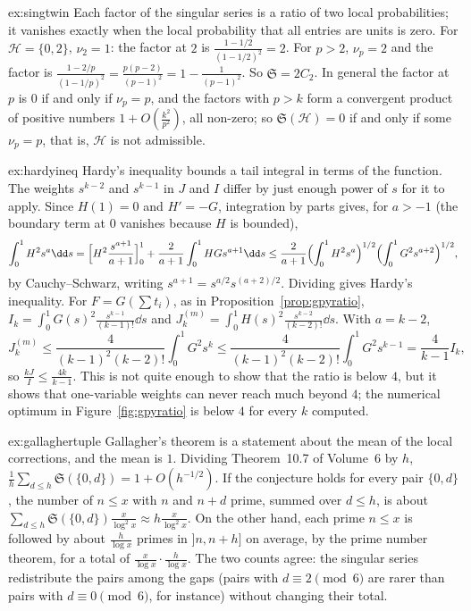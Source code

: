 \begin{solution}{ex:singtwin}
\idea Each factor of the singular series is a ratio of two local probabilities; it vanishes exactly when the local probability that all entries are units is zero.
\writeup For $\mathcal H=\{0,2\}$, $\nu_2=1$: the factor at $2$ is $\frac{1-1/2}{(1-1/2)^2}=2$. For $p>2$, $\nu_p=2$ and the factor is $\frac{1-2/p}{(1-1/p)^2}=\frac{p(p-2)}{(p-1)^2}=1-\frac1{(p-1)^2}$. So $\mathfrak S=2C_2$. In general the factor at $p$ is $0$ if and only if $\nu_p=p$, and the factors with $p>k$ form a convergent product of positive numbers $1+O(\frac{k^2}{p^2})$, all non-zero; so $\mathfrak S(\mathcal H)=0$ if and only if some $\nu_p=p$, that is, $\mathcal H$ is not admissible.
\end{solution}

\begin{solution}{ex:hardyineq}
\idea Hardy's inequality bounds a tail integral in terms of the function. The weights $s^{k-2}$ and $s^{k-1}$ in $J$ and $I$ differ by just enough power of $s$ for it to apply.
\writeup Since $H(1)=0$ and $H'=-G$, integration by parts gives, for $a>-1$ (the boundary term at $0$ vanishes because $H$ is bounded),
\[
\int_0^1H^2s^a\dd s=\Bigl[H^2\frac{s^{a+1}}{a+1}\Bigr]_0^1+\frac2{a+1}\int_0^1HGs^{a+1}\dd s\le\frac2{a+1}\Bigl(\int_0^1H^2s^a\Bigr)^{1/2}\Bigl(\int_0^1G^2s^{a+2}\Bigr)^{1/2},
\]
by Cauchy--Schwarz, writing $s^{a+1}=s^{a/2}s^{(a+2)/2}$. Dividing gives Hardy's inequality. For $F=G(\sum t_i)$, as in Proposition~\ref{prop:gpyratio}, $I_k=\int_0^1G(s)^2\frac{s^{k-1}}{(k-1)!}\dd s$ and $J_k^{(m)}=\int_0^1H(s)^2\frac{s^{k-2}}{(k-2)!}\dd s$. With $a=k-2$,
\[
J_k^{(m)}\le\frac4{(k-1)^2(k-2)!}\int_0^1G^2s^k\le\frac4{(k-1)^2(k-2)!}\int_0^1G^2s^{k-1}=\frac{4}{k-1}I_k,
\]
so $\frac{kJ}I\le\frac{4k}{k-1}$. This is not quite enough to show that the ratio is below $4$, but it shows that one-variable weights can never reach much beyond $4$; the numerical optimum in Figure~\ref{fig:gpyratio} is below $4$ for every $k$ computed.
\end{solution}

\begin{solution}{ex:gallaghertuple}
\idea Gallagher's theorem is a statement about the mean of the local corrections, and the mean is $1$.
\writeup Dividing Theorem~10.7 of Volume~6 by $h$, $\frac1h\sum_{d\le h}\mathfrak S(\{0,d\})=1+O(h^{-1/2})$. If the conjecture holds for every pair $\{0,d\}$, the number of $n\le x$ with $n$ and $n+d$ prime, summed over $d\le h$, is about $\sum_{d\le h}\mathfrak S(\{0,d\})\frac x{\log^2x}\approx h\frac x{\log^2x}$. On the other hand, each prime $n\le x$ is followed by about $\frac h{\log x}$ primes in $]n,n+h]$ on average, by the prime number theorem, for a total of $\frac x{\log x}\cdot\frac h{\log x}$. The two counts agree: the singular series redistribute the pairs among the gaps (pairs with $d\equiv2\pmod 6$ are rarer than pairs with $d\equiv0\pmod6$, for instance) without changing their total.
\end{solution}

